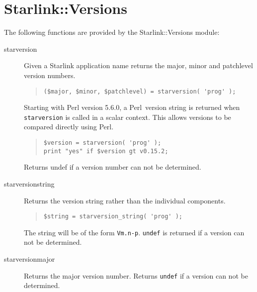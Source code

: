 \documentclass[twoside,11pt]{article}
\newenvironment{myquote}{\begin{quote}\begin{small}}{\end{small}\end{quote}}
\newcommand{\perl}{\xref{\textsf{Perl}}{sun193}{}}
\newcommand{\xref}[3]{#1}
\renewcommand{\_}{\texttt{\symbol{95}}}
\begin{document}
\section{Starlink::Versions\label{Starlink::Versions}}


The following functions are provided by the Starlink::Versions module:

\begin{description}

\item[starversion] \mbox{}

Given a Starlink application name returns the major, minor and
patchlevel version numbers.

\begin{myquote}
\begin{verbatim}
($major, $minor, $patchlevel) = starversion( 'prog' );
\end{verbatim}
\end{myquote} %


Starting with Perl version 5.6.0, a \perl\ version string is returned
when \texttt{starversion} is called in a scalar context. This allows 
versions to be compared directly using Perl.

\begin{myquote}
\begin{verbatim}
$version = starversion( 'prog' );
print "yes" if $version gt v0.15.2;
\end{verbatim}
\end{myquote}

Returns undef if a version number can not be determined.

\item[starversion\_string] \mbox{}

Returns the version string rather than the individual components.

\begin{myquote}
\begin{verbatim}
$string = starversion_string( 'prog' );
\end{verbatim}
\end{myquote} %

The string will be of the form \texttt{Vm.n-p}. \texttt{undef} is returned
if a version can not be determined.

\item[starversion\_major] \mbox{}

Returns the major version number. Returns \texttt{undef} if a version
can not be determined.


\end{description}
\end{document}

